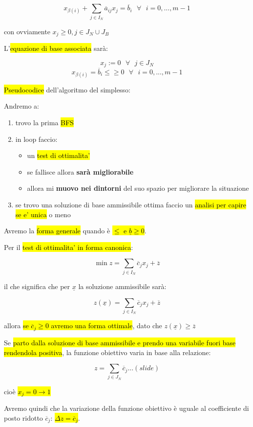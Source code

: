 $$x_{\beta(i)} + \sum_{j \in  I_N} \overline{a}_{ij}x_j = \overline{b}_i\ \ \ \forall\ \ \ i = 0, ..., m - 1$$

con ovviamente $x_j \geq 0, j \in J_N \cup J_B$

L'\hl{equazione di base associata} sarà:

$$x_j := 0\ \ \ \forall\ \ \ j \in J_N$$
$$x_{\beta(i)} = \overline{b}_i \leq \geq 0\ \ \ \forall\ \ \ i = 0, ..., m-1$$

\hl{Pseudocodice} dell'algoritmo del simplesso:

Andremo a:

\begin{enumerate}
	\item trovo la prima \hl{BFS}
	\item in loop faccio:
		\begin{itemize}
			\item un \hl{test di ottimalita'}
			\item se fallisce allora \textbf{sarà migliorabile}
			\item allora mi \textbf{muovo nei dintorni} del suo spazio per migliorare la situazione
		\end{itemize}
	\item se trovo una soluzione di base ammissibile ottima faccio un \hl{analisi per capire se e' unica} o meno
\end{enumerate}


Avremo la \hl{forma generale} quando è \hl{$\leq$ e $\underline{b} \geq 0$}.

Per il \hl{test di ottimalita' in forma canonica}:

$$\min z = \sum_{j \in  I_N} \overline{c}_jx_j + \overline{z}$$

il che significa che per $\underline{x}$ la soluzione ammissibile sarà:

$$z(\underline{x}) = \sum_{j \in  I_N} \overline{c}_jx_j + \overline{z}$$

allora \hl{se $\overline{c}_j \geq 0$ avremo una forma ottimale}, dato che $z(\underline{x}) \geq \overline{z}$

Se \hl{parto dalla soluzione di base ammissibile e prendo una variabile fuori base rendendola positiva}, la funzione obiettivo varia in base alla relazione:

$$z = \sum_{j \in J_N} \overline{c}_j...(slide)$$

cioè \hl{$x_j = 0 \to 1$}

Avremo quindi che la variazione della funzione obiettivo è uguale al coefficiente di posto ridotto $\overline{c}_j$: \hl{$\Delta z = \overline{c}_j$}.

